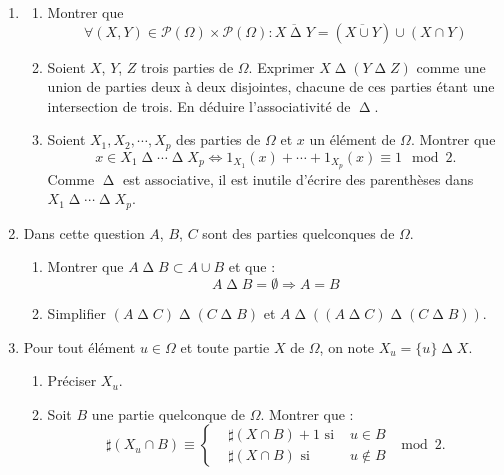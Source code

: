 \begin{enumerate}
\item \begin{enumerate}
 \item Montrer que 
\begin{displaymath}
 \forall (X,Y)\in \mathcal P(\Omega)\times \mathcal P(\Omega) :
\overline{X \mathop{\Delta} Y} = \left( \overline{X\cup Y}\right) \cup \left(X\cap Y \right)
\end{displaymath}
\item Soient $X$, $Y$, $Z$ trois parties de $\Omega$. Exprimer $X\mathop{\Delta}( Y\mathop{\Delta} Z)$ comme une union de parties deux à deux disjointes, chacune de ces parties étant une intersection de trois. En déduire l'associativité de $\mathop{\Delta}$.
\item Soient $X_1, X_2, \cdots ,X_p$ des parties de $\Omega$ et $x$ un élément de $\Omega$. Montrer que
\begin{displaymath}
 x \in X_1 \mathop{\Delta} \cdots \mathop{\Delta} X_p
 \Leftrightarrow 1_{X_1}(x) + \cdots + 1_{X_p}(x) \equiv 1 \mod 2.
\end{displaymath}
Comme $\mathop{\Delta}$ est associative, il est inutile d'écrire des parenthèses dans $X_1 \mathop{\Delta} \cdots \mathop{\Delta} X_p$.
\end{enumerate}

\item Dans cette question $A$, $B$, $C$ sont des parties quelconques de $\Omega$.
\begin{enumerate}
 \item Montrer que $A\mathop{\Delta} B \subset A \cup B$ et que :
\begin{displaymath}
 A\mathop{\Delta} B = \emptyset \Rightarrow A=B
\end{displaymath}
\item Simplifier $\left(A\mathop{\Delta} C \right)\mathop{\Delta} \left(C\mathop{\Delta} B \right)$ et $A\mathop{\Delta}\left( \left(A\mathop{\Delta} C \right)\mathop{\Delta} \left(C\mathop{\Delta} B \right)\right)$.
\end{enumerate}
\item Pour tout élément $u\in \Omega$ et toute partie $X$ de $\Omega$, on note $X_u = \{u\}\mathop{\Delta} X$. \begin{enumerate}
\item  Préciser $X_u$.
\item Soit $B$ une partie quelconque de $\Omega$. Montrer que :
\begin{displaymath}
\sharp(X_u\cap B) \equiv 
\left\lbrace 
\begin{aligned}
 &\sharp(X\cap B) +1 \text{ si }& u\in B \\
 &\sharp(X\cap B)  \text{ si }& u\notin B
\end{aligned}
\right. 
\mod 2.
\end{displaymath}
\end{enumerate}


\end{enumerate}
